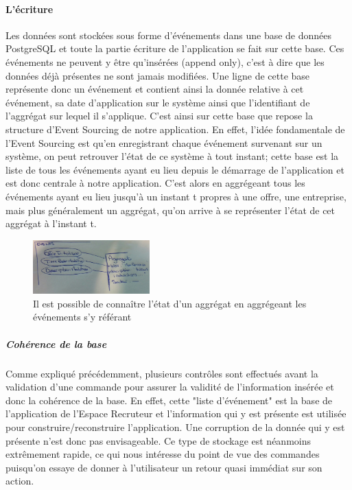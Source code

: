 \paragraph{L'écriture}
\label{par:L'écriture}
Les données sont stockées sous forme d'événements dans une base de données PostgreSQL et toute la partie écriture de l'application se fait sur cette base.
Ces événements ne peuvent y être qu'insérées (append only), c'est à dire que les données déjà présentes ne sont jamais modifiées.
Une ligne de cette base représente donc un événement et contient ainsi la donnée relative à cet événement, sa date d'application sur le système ainsi que l'identifiant de l'aggrégat sur lequel il s'applique.
C'est ainsi sur cette base que repose la structure d'Event Sourcing de notre application.
En effet, l'idée fondamentale de l'Event Sourcing est qu'en enregistrant chaque événement survenant sur un système, on peut retrouver l'état de ce système à tout instant; cette base est la liste de tous les événements ayant eu lieu depuis le démarrage de l'application et est donc centrale à notre application.
C'est alors en aggrégeant tous les événements ayant eu lieu jusqu'à un instant t propres à une offre, une entreprise, mais plus généralement un aggrégat, qu'on arrive à se représenter l'état de cet aggrégat à l'instant t.
\begin{figure}[h]
  \begin{center}
    \includegraphics[width=0.4\textwidth]{Pictures/EventSourcing/events.png}
    \caption{Il est possible de connaître l'état d'un aggrégat en aggrégeant les événements s'y référant}
  \end{center}
\end{figure}
\subparagraph{Cohérence de la base}
Comme expliqué précédemment, plusieurs contrôles sont effectués avant la validation d'une commande pour assurer la validité de l'information insérée et donc la cohérence de la base.
En effet, cette "liste d'événement" est la base de l'application de l'Espace Recruteur et l'information qui y est présente est utilisée pour construire/reconstruire l'application.
Une corruption de la donnée qui y est présente n'est donc pas envisageable.
Ce type de stockage est néanmoins extrêmement rapide, ce qui nous intéresse du point de vue des commandes puisqu'on essaye de donner à l'utilisateur un retour quasi immédiat sur son action.

